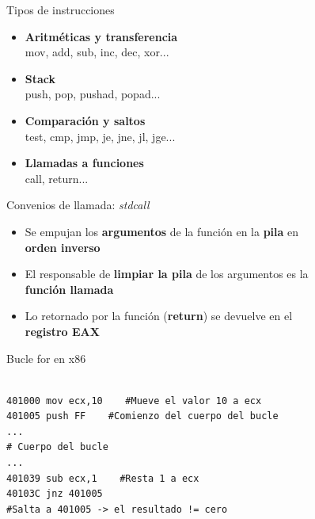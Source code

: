 \documentclass{beamer}
\begin{document}
\begin{frame}{Tipos de instrucciones}
\begin{itemize}
\item \textbf{Aritméticas y transferencia} \\ \hspace{4ex}mov, add, sub, inc, dec, xor...
\vspace{3ex}
\item \textbf{Stack} \\ \hspace{4ex}push, pop, pushad, popad...
\vspace{3ex}
\item \textbf{Comparación y saltos} \\ \hspace{4ex}test, cmp, jmp, je, jne, jl, jge...
\vspace{3ex}
\item \textbf{Llamadas a funciones} \\ \hspace{4ex}call, return...
\end{itemize}
\end{frame}

\begin{frame}{Convenios de llamada: \textit{stdcall}}
\begin{itemize}
\item Se empujan los \textbf{argumentos} de la función en la \textbf{pila} en \\ \hspace{4ex}\textbf{orden inverso}
\vspace{5ex}
\item El responsable de \textbf{limpiar la pila} de los argumentos es la \\ \hspace{4ex}\textbf{función llamada}
\vspace{5ex}
\item Lo retornado por la función (\textbf{return}) se devuelve en el \\ \hspace{4ex}\textbf{registro EAX}
\end{itemize}
\end{frame}

\begin{frame}[fragile]{Bucle for en x86}
\begin{lstlisting}

401000 mov ecx,10    #Mueve el valor 10 a ecx
401005 push FF    #Comienzo del cuerpo del bucle
...
# Cuerpo del bucle
...
401039 sub ecx,1    #Resta 1 a ecx
40103C jnz 401005
#Salta a 401005 -> el resultado != cero

\end{lstlisting}
\end{frame}
\end{document}
